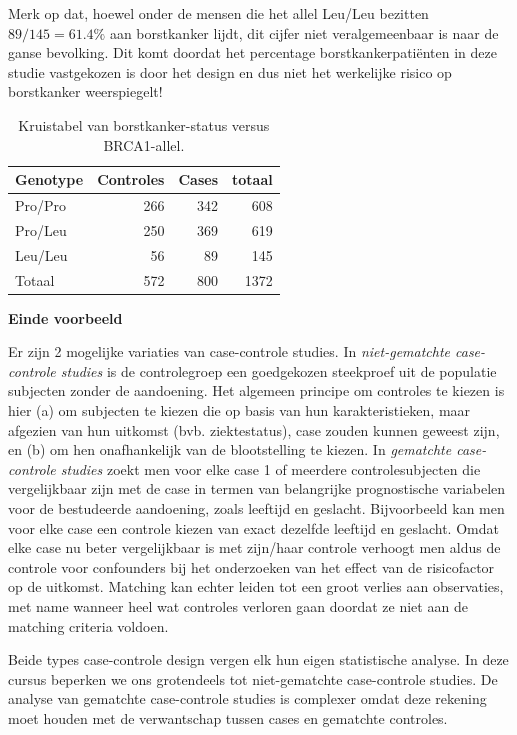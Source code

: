 \documentclass[
  12pt,dutch]{book}
\theoremstyle{definition}
\theoremstyle{definition}
\theoremstyle{definition}
\theoremstyle{definition}
\theoremstyle{remark}
\begin{document}
Merk op dat, hoewel onder de mensen die het allel Leu/Leu bezitten \(89/145=61.4\%\) aan borstkanker lijdt, dit cijfer niet
veralgemeenbaar is naar de ganse bevolking. Dit komt doordat het percentage
borstkankerpatiënten in deze studie vastgekozen is door het design en dus
niet het werkelijke risico op borstkanker weerspiegelt!

\begin{table}

\caption{\label{tab:leu}Kruistabel van borstkanker-status versus BRCA1-allel.}
\centering
\begin{tabular}[t]{lrrr}
\toprule
Genotype & Controles & Cases & totaal\\
\midrule
Pro/Pro & 266 & 342 & 608\\
Pro/Leu & 250 & 369 & 619\\
Leu/Leu & 56 & 89 & 145\\
Totaal & 572 & 800 & 1372\\
\bottomrule
\end{tabular}
\end{table}

\textbf{Einde voorbeeld}

Er zijn 2 mogelijke variaties van case-controle studies. In \emph{niet-gematchte case-controle studies} is de controlegroep een goedgekozen
steekproef uit de populatie subjecten zonder de
aandoening. Het algemeen principe om controles te kiezen is hier (a) om
subjecten te kiezen die op basis van hun karakteristieken,
maar afgezien van hun uitkomst (bvb. ziektestatus), case zouden kunnen
geweest zijn, en (b) om hen onafhankelijk van de blootstelling te kiezen. In
\emph{gematchte case-controle studies} zoekt men voor elke case 1 of
meerdere controlesubjecten die vergelijkbaar zijn met de case in termen van
belangrijke prognostische variabelen voor de bestudeerde aandoening, zoals
leeftijd en geslacht. Bijvoorbeeld kan men voor elke case een controle
kiezen van exact dezelfde leeftijd en geslacht. Omdat elke case nu beter
vergelijkbaar is met zijn/haar controle verhoogt men aldus de controle voor
confounders bij het onderzoeken van het effect van de risicofactor op de
uitkomst. Matching kan echter leiden tot een groot verlies aan observaties,
met name wanneer heel wat controles verloren gaan doordat ze niet aan de
matching criteria voldoen.

Beide types case-controle design vergen elk hun eigen statistische analyse.
In deze cursus beperken we ons grotendeels tot niet-gematchte case-controle studies. De
analyse van gematchte case-controle studies is complexer omdat deze rekening
moet houden met de verwantschap tussen cases en gematchte controles.
\end{document}
